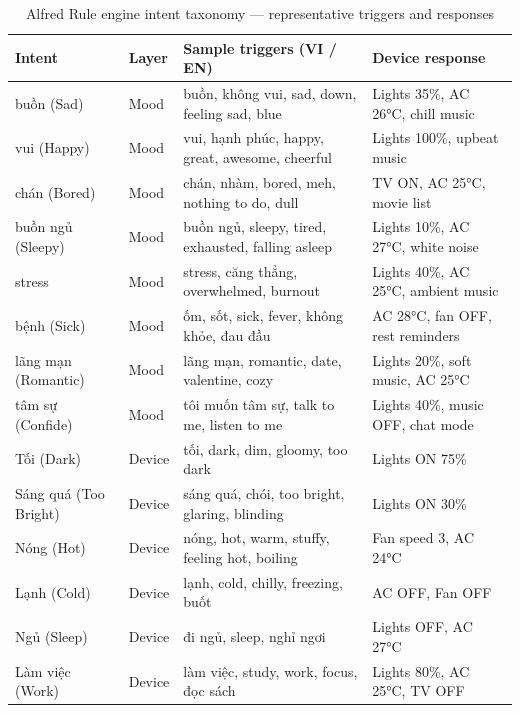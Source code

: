 \begin{table}[H]
\centering
\caption{Alfred Rule engine intent taxonomy --- representative triggers and responses}
\label{tab:alfred_rule_keywords}
\small
\begin{tabularx}{\textwidth}{@{} l l >{\RaggedRight\arraybackslash}X >{\RaggedRight\arraybackslash}p{3.4cm} @{}}
\toprule
\textbf{Intent} & \textbf{Layer} & \textbf{Sample triggers (VI / EN)} & \textbf{Device response} \\
\midrule
buồn (Sad)         & Mood & buồn, không vui, sad, down, feeling sad, blue        & Lights 35\%, AC 26°C, chill music \\
vui (Happy)        & Mood & vui, hạnh phúc, happy, great, awesome, cheerful      & Lights 100\%, upbeat music \\
chán (Bored)       & Mood & chán, nhàm, bored, meh, nothing to do, dull          & TV ON, AC 25°C, movie list \\
buồn ngủ (Sleepy)  & Mood & buồn ngủ, sleepy, tired, exhausted, falling asleep   & Lights 10\%, AC 27°C, white noise \\
stress             & Mood & stress, căng thẳng, overwhelmed, burnout             & Lights 40\%, AC 25°C, ambient music \\
bệnh (Sick)        & Mood & ốm, sốt, sick, fever, không khỏe, đau đầu           & AC 28°C, fan OFF, rest reminders \\
lãng mạn (Romantic)& Mood & lãng mạn, romantic, date, valentine, cozy           & Lights 20\%, soft music, AC 25°C \\
tâm sự (Confide)   & Mood & tôi muốn tâm sự, talk to me, listen to me          & Lights 40\%, music OFF, chat mode \\
\midrule
Tối (Dark)         & Device & tối, dark, dim, gloomy, too dark                  & Lights ON 75\% \\
Sáng quá (Too Bright) & Device & sáng quá, chói, too bright, glaring, blinding & Lights ON 30\% \\
Nóng (Hot)         & Device & nóng, hot, warm, stuffy, feeling hot, boiling      & Fan speed 3, AC 24°C \\
Lạnh (Cold)        & Device & lạnh, cold, chilly, freezing, buốt                & AC OFF, Fan OFF \\
Ngủ (Sleep)        & Device & đi ngủ, sleep, nghỉ ngơi                          & Lights OFF, AC 27°C \\
Làm việc (Work)    & Device & làm việc, study, work, focus, đọc sách            & Lights 80\%, AC 25°C, TV OFF \\

\end{tabularx}
\end{table}
